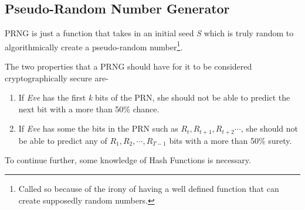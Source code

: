 		\subsection{Pseudo-Random Number Generator}\label{subsec:prng}
			PRNG is just a function that takes in an initial seed \emph{S} which is truly random to algorithmically create a pseudo-random number\footnote{Called so because of the irony of having a well defined function that can create supposedly random numbers.}.\par
			The two properties that a PRNG should have for it to be considered cryptographically secure are-
			\begin{enumerate}
				\item If \emph{Eve} has the first \emph{k} bits of the PRN, she should not be able to predict the next bit with a more than 50\% chance.
				\item If \emph{Eve} has some the bits in the PRN such as \(R_t, R_{t+1}, R_{t+2} \cdots\), she should not be able to predict any of \(R_1, R_2, \cdots , R_{T-1}\) bits with a more than 50\% surety.
			\end{enumerate}

			To continue further, some knowledge of Hash Functions is necessary.

